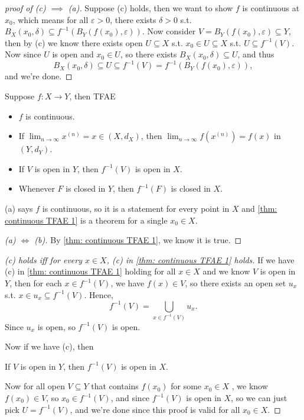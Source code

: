 \begin{proof}[proof of (c) \(\implies \) (a)]
    Suppose (c) holds, then we want to show \(f\) is continuous at \(x_0\), which means for all \(\varepsilon > 0\), there exists \(\delta > 0\) s.t. \(B_X(x_0, \delta ) \subseteq f^{-1} \left( B_Y(f(x_0), \varepsilon ) \right) \). Now consider \(V = B_Y(f(x_0), \varepsilon ) \subseteq Y\), then by (c) we know there exists open \(U \subseteq X\) s.t. \(x_0 \in U \subseteq X\) s.t. \(U \subseteq f^{-1}(V) \). Now since \(U\) is open and \(x_0 \in U\), so there exists \(B_X(x_0, \delta ) \subseteq U\), and thus 
    \[
        B_X(x_0, \delta ) \subseteq U \subseteq f^{-1}(V) = f^{-1} \left( B_Y (f(x_0), \varepsilon ) \right), 
    \] and we're done.
\end{proof}

\begin{theorem} \label{thm: continous TFAE2}
    Suppose \(f: X \to Y\), then TFAE 
    \begin{itemize}
        \item [(a)] \(f\) is continuous. 
        \item [(b)] If \(\lim_{n \to \infty} x^{(n)} = x \in (X, d_X)\), then \(\lim_{n \to \infty} f \left( x^{(n)} \right) = f(x)  \) in \(\left( Y, d_Y \right) \). 
        \item [(c)] If \(V\) is open in \(Y\), then \(f^{-1}(V)\) is open in \(X\). 
        \item [(d)] Whenever \(F\) is closed in \(Y\), then \(f^{-1}(F)\) is closed in \(X\).         
    \end{itemize}
    \begin{note}
        (a) says \(f\) is continuous, so it is a statement for every point in \(X\) and \autoref{thm: continuous TFAE 1} is a theorem for a single \(x_0 \in X\).    
    \end{note}
\end{theorem}
\begin{proof}[(a) \(\iff \) (b)]
    By \autoref{thm: continuous TFAE 1}, we know it is true. 
\end{proof}
\begin{proof}[(c) holds iff for every \(x \in X\), (c) in \autoref{thm: continuous TFAE 1} holds]
    If we have (c) in \autoref{thm: continuous TFAE 1} holding for all \(x \in X\) and we know \(V\) is open in \(Y\), then for each \(x \in f^{-1}(V)\), we have \(f(x) \in V\), so there exists an open set \(u_x\) s.t. \(x \in u_x \subseteq f^{-1}(V)\). Hence, 
    \[
        f^{-1}(V) = \bigcup_{x \in f^{-1}(V)} u_x .  
    \] Since \(u_x\) is open, so \(f^{-1}(V)\) is open.  
    
    Now if we have (c), then
    \begin{center}
        If \(V\) is open in \(Y\), then \(f^{-1}(V)\) is open in \(X\).    
    \end{center}
    Now for all open \(V \subseteq Y\) that contains \(f(x_0)\) for some \(x_0 \in X\) , we know \(f(x_0) \in V\), so \(x_0 \in f^{-1}(V)\), and since \(f^{-1}(V)\) is open in \(X\), so we can just pick \(U = f^{-1}(V)\), and we're done since this proof is valid for all \(x_0 \in X\).     
\end{proof}
